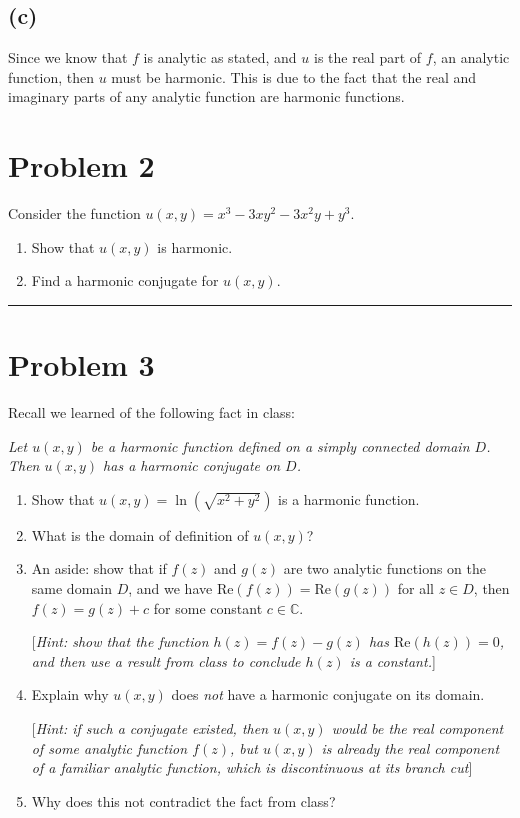 \documentclass{article}
\begin{document}
\subsection{(c)}
Since we know that $f$ is analytic as stated, and $u$ is the real part of $f$, an analytic function, then $u$ must be harmonic. This is due to the fact that the real and imaginary parts of any analytic function are harmonic functions.
\newpage
\section*{Problem 2}
Consider the function  $u(x,y) = x^3 - 3 x y^2 - 3 x^2 y + y^3$.

\begin{enumerate}
	\item [(a)] Show that $u(x,y)$ is harmonic.
	\item [(b)] Find a harmonic conjugate for $u(x,y)$.
\end{enumerate}


\vspace{.5cm} %

\hrule

\newpage
\section*{Problem 3}
Recall we learned of the following fact in class:

\begin{center}
	{\em Let $u(x,y)$ be a harmonic function defined on a simply connected domain $D$. \\ Then $u(x,y)$ has a harmonic conjugate on $D$.}
\end{center}

\begin{enumerate}
	\item [(a)] Show that $u(x,y) = \ln(\sqrt{x^2 + y^2})$ is a harmonic function.

	\item [(b)] What is the domain of definition of $u(x,y)$?

	\item [(c)] An aside: show that if $f(z)$ and $g(z)$ are two analytic functions on the same domain $D$, and we have $\text{Re}(f(z)) = \text{Re}(g(z))$ for all $z \in D$, then $f(z) = g(z) + c$ for some constant $c \in \mathbb{C}$.

          [{\em Hint: show that the function $h(z) = f(z) - g(z)$ has $\text{Re}(h(z)) = 0$, and then use a result from class to conclude $h(z)$ is a constant.}]

	\item [(d)] Explain why $u(x,y)$ does {\it not} have a harmonic conjugate on its domain.

          [{\em Hint: if such a conjugate existed, then $u(x,y)$ would be the real component of some analytic function $f(z)$, but $u(x,y)$ is already the real component of a familiar analytic function, which is discontinuous at its branch cut}]

	\item Why does this not contradict the fact from class?
\end{enumerate}
\end{document}
